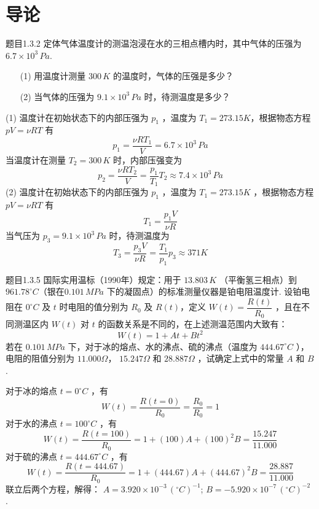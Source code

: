 \section{导论}

\begin{question}{题目1.3.2}
    定体气体温度计的测温泡浸在水的三相点槽内时，其中气体的压强为$6.7\times10^3\,\si{Pa}$.
    \begin{enumerate}
        \item[(1)] 用温度计测量 $300\,\si{K}$ 的温度时，气体的压强是多少？
        \item[(2)] 当气体的压强为 $9.1\times 10^3\,\si{Pa}$ 时，待测温度是多少？
    \end{enumerate}
\end{question}

\begin{solution}
    (1) 温度计在初始状态下的内部压强为 $p_1$ ，温度为 $T_1 = 273.15 \si{K}$，根据物态方程 $pV = \nu RT$ 有
    $$
        p_1 = \frac{\nu RT_1}{V} = 6.7 \times 10^3 \,\si{Pa}
    $$
    当温度计在测量 $T_2 = 300\,\si{K}$ 时，内部压强变为
    $$
        p_2 = \frac{\nu RT_2}{V}
        = \frac{p_1}{T_1}T_2
        \approx 7.4 \times 10^3 \,\si{Pa}
    $$
    (2) 温度计在初始状态下的内部压强为 $p_1$ ，温度为 $T_1 = 273.15 \si{K}$ ，根据物态方程 $pV = \nu RT$ 有
    $$
        T_1 = \frac{p_1V}{\nu R}
    $$
    当气压为 $p_3 = 9.1 \times 10^3 \,\si{Pa}$ 时，待测温度为
    $$
        T_3 = \frac{p_3V}{\nu R}
        = \frac{T_1}{p_1}p_3
        \approx 371 \si{K}
    $$
\end{solution}

\begin{question}{题目1.3.5}
    国际实用温标（1990年）规定：用于 $13.803 \,\si{K}$ （平衡氢三相点）到 $961.78^\circ C$（银在$0.101 \,\si{MPa}$ 下的凝固点）的标准测量仪器是铂电阻温度计. 设铂电阻在 $0^\circ C$ 及 $t$ 时电阻的值分别为 $R_0$ 及 $R(t)$，定义 $W(t) = \dfrac{R(t)}{R_0}$ ，且在不同测温区内 $W(t)$ 对 $t$ 的函数关系是不同的，在上述测温范围内大致有：
    $$
        W(t) = 1 + At + Bt^2
    $$
    若在 $0.101\,\si{MPa}$ 下，对于冰的熔点、水的沸点、硫的沸点（温度为 $444.67^\circ C$ ），电阻的阻值分别为 $11.000\Omega$， $15.247\Omega$ 和 $28.887\Omega$ ，试确定上式中的常量 $A$ 和 $B$ .
\end{question}
\begin{solution}
    对于冰的熔点 $t = 0^\circ C$ ，有
    $$
        W(t) = \frac{R(t = 0)}{R_0} = \frac{R_0}{R_0} = 1
    $$
    对于水的沸点 $t = 100^\circ C$ ，有
    $$
        W(t) = \frac{R(t = 100)}{R_0} = 1+(100)A+(100)^2B = \frac{15.247}{11.000}
    $$
    对于硫的沸点 $t = 444.67^\circ C$ ，有
    $$
        W(t) = \frac{R(t = 444.67)}{R_0} = 1+(444.67)A+(444.67)^2B = \frac{28.887}{11.000}
    $$
    联立后两个方程，解得： $A = 3.920 \times 10^{-3} \,\si{(^\circ C)^{-1}}$; $B = -5.920 \times 10^{-7} \,\si{(^\circ C)^{-2}}$ .
\end{solution}

